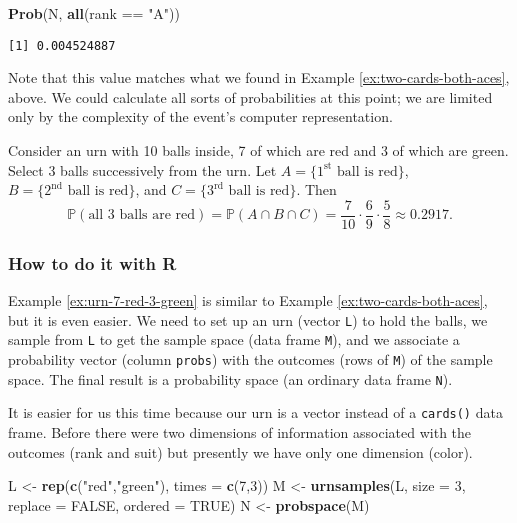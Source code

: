 \documentclass[]{book}
\newenvironment{Shaded}{\begin{snugshade}}{\end{snugshade}}
\newcommand{\KeywordTok}[1]{\textcolor[rgb]{0.13,0.29,0.53}{\textbf{{#1}}}}
\newcommand{\DataTypeTok}[1]{\textcolor[rgb]{0.13,0.29,0.53}{{#1}}}
\newcommand{\DecValTok}[1]{\textcolor[rgb]{0.00,0.00,0.81}{{#1}}}
\newcommand{\StringTok}[1]{\textcolor[rgb]{0.31,0.60,0.02}{{#1}}}
\newcommand{\OtherTok}[1]{\textcolor[rgb]{0.56,0.35,0.01}{{#1}}}
\newcommand{\NormalTok}[1]{{#1}}
\numberwithin{equation}{chapter}
\numberwithin{figure}{chapter}
\theoremstyle{plain}
\theoremstyle{definition}
\theoremstyle{remark}
\theoremstyle{definition}
\theoremstyle{definition}
\theoremstyle{remark}
\let\BeginKnitrBlock\begin \let\EndKnitrBlock\end
\begin{document}
\begin{Shaded}
\begin{Highlighting}[]
\KeywordTok{Prob}\NormalTok{(N, }\KeywordTok{all}\NormalTok{(rank ==}\StringTok{ "A"}\NormalTok{))}
\end{Highlighting}
\end{Shaded}

\begin{verbatim}
[1] 0.004524887
\end{verbatim}

Note that this value matches what we found in Example
\ref{ex:two-cards-both-aces}, above. We could calculate all sorts of
probabilities at this point; we are limited only by the complexity of
the event's computer representation.

\bigskip

\BeginKnitrBlock{example}
\protect\hypertarget{ex:urn-7-red-3-green}{}{\label{ex:urn-7-red-3-green}}Consider
an urn with 10 balls inside, 7 of which are red and 3 of which are
green. Select 3 balls successively from the urn. Let
\(A = \{ 1^{\mathrm{st}} \mbox{ ball is red} \}\),
\(B = \{ 2^{\mathrm{nd}} \mbox{ ball is red} \}\), and
\(C = \{ 3^{\mathrm{rd}} \mbox{ ball is red} \}\). Then \[
\mathbb{P}(\mbox{all 3 balls are red})=\mathbb{P}(A\cap B\cap
C)=\frac{7}{10}\cdot\frac{6}{9}\cdot\frac{5}{8}\approx 0.2917.  \]
\EndKnitrBlock{example}

\subsubsection{How to do it with R}\label{how-to-do-it-with-r-16}

Example \ref{ex:urn-7-red-3-green} is similar to Example
\ref{ex:two-cards-both-aces}, but it is even easier. We need to set up
an urn (vector \texttt{L}) to hold the balls, we sample from \texttt{L}
to get the sample space (data frame \texttt{M}), and we associate a
probability vector (column \texttt{probs}) with the outcomes (rows of
\texttt{M}) of the sample space. The final result is a probability space
(an ordinary data frame \texttt{N}).

It is easier for us this time because our urn is a vector instead of a
\texttt{cards()} data frame. Before there were two dimensions of
information associated with the outcomes (rank and suit) but presently
we have only one dimension (color).

\begin{Shaded}
\begin{Highlighting}[]
\NormalTok{L <-}\StringTok{ }\KeywordTok{rep}\NormalTok{(}\KeywordTok{c}\NormalTok{(}\StringTok{"red"}\NormalTok{,}\StringTok{"green"}\NormalTok{), }\DataTypeTok{times =} \KeywordTok{c}\NormalTok{(}\DecValTok{7}\NormalTok{,}\DecValTok{3}\NormalTok{))}
\NormalTok{M <-}\StringTok{ }\KeywordTok{urnsamples}\NormalTok{(L, }\DataTypeTok{size =} \DecValTok{3}\NormalTok{, }\DataTypeTok{replace =} \OtherTok{FALSE}\NormalTok{, }\DataTypeTok{ordered =} \OtherTok{TRUE}\NormalTok{)}
\NormalTok{N <-}\StringTok{ }\KeywordTok{probspace}\NormalTok{(M)}
\end{Highlighting}
\end{Shaded}
\end{document}
